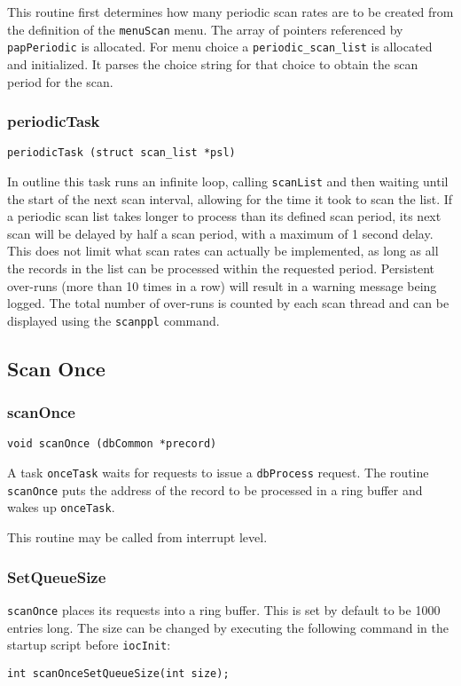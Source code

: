 This routine first determines how many periodic scan rates are to be created from the definition of the \verb|menuScan| menu.
The array of pointers referenced by \verb|papPeriodic| is allocated.
For menu choice a \verb|periodic_scan_list| is allocated and initialized.
It parses the choice string for that choice to obtain the scan period for the scan.

\subsubsection{periodicTask}

\begin{verbatim}
periodicTask (struct scan_list *psl)
\end{verbatim}

In outline this task runs an infinite loop, calling \verb|scanList| and then waiting until the start of the next scan interval, allowing for the time it took to scan the list.
If a periodic scan list takes longer to process than its defined scan period, its next scan will be delayed by half a scan period, with a maximum of 1 second delay.
This does not limit what scan rates can actually be implemented, as long as all the records in the list can be processed within the requested period.
Persistent over-runs (more than 10 times in a row) will result in a warning message being logged.
The total number of over-runs is counted by each scan thread and can be displayed using the \verb|scanppl| command.

\subsection{Scan Once}

\subsubsection{scanOnce}

\begin{verbatim}
void scanOnce (dbCommon *precord)
\end{verbatim}

A task \verb|onceTask| waits for requests to issue a \verb|dbProcess| request.
The routine \verb|scanOnce| puts the address of the record to be processed in a ring buffer and wakes up \verb|onceTask|.

This routine may be called from interrupt level.

\subsubsection{SetQueueSize}

\verb|scanOnce| places its requests into a ring buffer.
This is set by default to be 1000 entries long.
The size can be changed by executing the following command in the startup script before \verb|iocInit|:

\begin{verbatim}
int scanOnceSetQueueSize(int size);
\end{verbatim}

